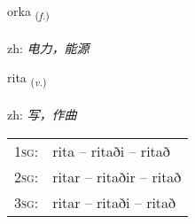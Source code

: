 \documentclass[frontgrid, backgrid]{flacards}\usepackage[]{graphicx}\usepackage[]{color}
\begin{document}
\renewcommand{\flhead}{\vskip5pt \fboxsep=0pt {\small\bfseries\footnotesize Nafnorð | 名词}}
\renewcommand{\fcfoot}{\vskip5pt \fboxsep=0pt \hspace{2pt}{\small\bfseries\footnotesize 2K}}

\renewcommand{\blhead}{\vskip5pt {\small\bfseries\footnotesize Nafnorð | 名词 }}
\renewcommand{\bcfoot}{\vskip5pt \hspace{2pt}{\small\bfseries\footnotesize 2K}}


{orka \small{\textsubscript{(\textit{f.})}} \\[1ex] %
\textphonetic{[ɔr̥ka]} \\
zh: \emph{电力，能源} \\  [2ex]
\renewcommand*{\arraystretch}{0.8}
}

\renewcommand{\flhead}{\vskip5pt \fboxsep=0pt {\small\bfseries\footnotesize Sagnorð | 动词}}
\renewcommand{\fcfoot}{\vskip5pt \fboxsep=0pt \hspace{2pt}{\small\bfseries\footnotesize 2K}}

\renewcommand{\blhead}{\vskip5pt {\small\bfseries\footnotesize Sagnorð | 动词 }}
\renewcommand{\bcfoot}{\vskip5pt \hspace{2pt}{\small\bfseries\footnotesize 2K}}


{rita \small{\textsubscript{(\textit{v.})}} \\[1ex] %
\textphonetic{[rɪːta]} \\
zh: \emph{写，作曲} \\  [2ex]
\renewcommand*{\arraystretch}{0.8}
\begin{tabular}{p{1cm}l}
\textsc{1sg}: & rita -- ritaði -- ritað \\ 
\textsc{2sg}: & ritar -- ritaðir -- ritað \\ 
\textsc{3sg}: & ritar -- ritaði -- ritað \\ 
\end{tabular}
}
\end{document}

